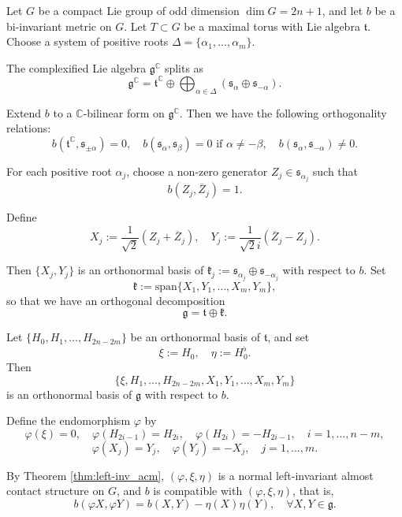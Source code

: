 \documentclass{article}
\makeatletter
\renewenvironment{proof}[1][\proofname]{%
  \par\pushQED{\qed}%
  \normalfont\topsep6\p@\@plus6\p@\relax
  \trivlist
  \item[\hskip\labelsep
        \textbf{\textup{#1}}\@addpunct{.}]\ignorespaces
}{%
  \popQED\endtrivlist\@endpefalse
}
\theoremstyle{definition}
\newcommand{\C}{\mathbb{C}}
\renewcommand{\phi}{\varphi}
\numberwithin{equation}{section}
\makeatother
\begin{document}
\begin{proof}
Let $G$ be a compact Lie group of odd dimension $\dim G = 2n+1$, and let $b$ be a bi-invariant metric on $G$.  
Let $T \subset G$ be a maximal torus with Lie algebra $\mathfrak{t}$.  
Choose a system of positive roots $\Delta = \{\alpha_1, \dots, \alpha_m\}$. 

The complexified Lie algebra $\mathfrak{g}^\C$ splits as
\[
\mathfrak{g}^\C = \mathfrak{t}^\C \oplus \bigoplus_{\alpha \in \Delta} (\mathfrak{s}_\alpha \oplus \mathfrak{s}_{-\alpha}).
\]

Extend $b$ to a $\C$-bilinear form on $\mathfrak{g}^\C$. Then we have the following orthogonality relations:
\[
b(\mathfrak{t}^\C, \mathfrak{s}_{\pm \alpha}) = 0, \quad
b(\mathfrak{s}_\alpha, \mathfrak{s}_\beta) = 0 \text{ if } \alpha \neq -\beta, \quad
b(\mathfrak{s}_\alpha, \mathfrak{s}_{-\alpha}) \neq 0.
\]

For each positive root $\alpha_j$, choose a non-zero generator $Z_j \in \mathfrak{s}_{\alpha_j}$ such that
\[
b(Z_j, \overline{Z}_j) = 1.
\]

Define
\[
X_j := \frac{1}{\sqrt{2}} (Z_j + \overline{Z}_j), \quad
Y_j := \frac{1}{\sqrt{2}i} (\overline{Z}_j - Z_j).
\]

Then $\{X_j, Y_j\}$ is an orthonormal basis of $\mathfrak{k}_j := \mathfrak{s}_{\alpha_j} \oplus \mathfrak{s}_{-\alpha_j}$ with respect to $b$.  
Set
\[
\mathfrak{k} := \mathrm{span}\{X_1, Y_1, \dots, X_m, Y_m\},
\]
so that we have an orthogonal decomposition
\[
\mathfrak{g} = \mathfrak{t} \oplus \mathfrak{k}.
\]

Let $\{H_0, H_1, \dots, H_{2n-2m}\}$ be an orthonormal basis of $\mathfrak{t}$, and set
\[
\xi := H_0, \quad \eta := H_0^\flat.
\]
Then
\[
\{\xi, H_1, \dots, H_{2n-2m}, X_1, Y_1, \dots, X_m, Y_m\}
\]
is an orthonormal basis of $\mathfrak{g}$ with respect to $b$.

Define the endomorphism $\phi$ by
\[
\phi(\xi) = 0, \quad \phi(H_{2i-1}) = H_{2i}, \quad \phi(H_{2i}) = -H_{2i-1}, \quad i = 1, \dots, n-m,
\]
\[
\phi(X_j) = Y_j, \quad \phi(Y_j) = -X_j, \quad j = 1, \dots, m.
\]

By Theorem \ref{thm:left-inv_acm}, $(\phi, \xi, \eta)$ is a normal left-invariant almost contact structure on $G$, and $b$ is compatible with $(\phi, \xi, \eta)$, that is, 
\[
b(\phi X, \phi Y) = b(X, Y) - \eta(X) \eta(Y), \quad \forall X, Y \in \mathfrak{g}.
\]


\end{proof}
\end{document}
